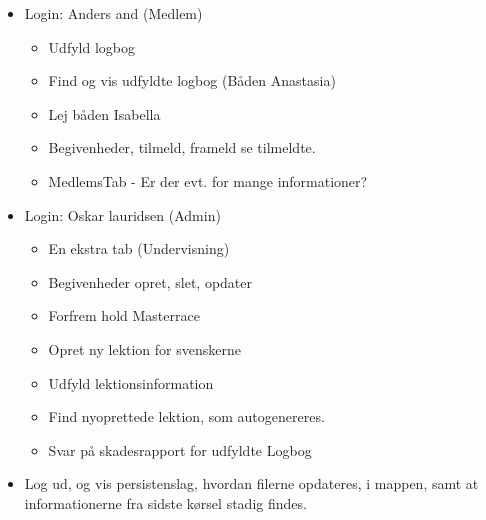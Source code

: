 \documentclass[a4paper,11pt,fleqn,twoside,openright,final]{memoir}
\begin{document}
\begin{itemize}
	\item Login: Anders and (Medlem)
		\begin{itemize}
			\item Udfyld logbog
			\item Find og vis udfyldte logbog (Båden Anastasia)
			\item Lej båden Isabella
			\item Begivenheder, tilmeld, frameld se tilmeldte.
			\item MedlemsTab - Er der evt. for mange informationer?
		\end{itemize}
	\item Login: Oskar lauridsen (Admin)
		\begin{itemize}
			\item En ekstra tab (Undervisning)
			\item Begivenheder opret, slet, opdater
			\item Forfrem hold Masterrace
			\item Opret ny lektion for svenskerne
			\item Udfyld lektionsinformation
			\item Find nyoprettede lektion, som autogenereres. 
			\item Svar på skadesrapport for udfyldte Logbog
		\end{itemize}
	\item Log ud, og vis persistenslag, hvordan filerne opdateres, i mappen, samt at informationerne fra sidste kørsel stadig findes.
\end{itemize}
\end{document}

